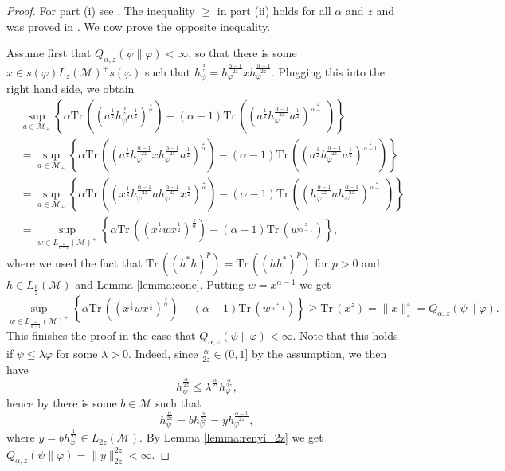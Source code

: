 \documentclass[12pt]{article}
\theoremstyle{definition}
\theoremstyle{remark}
\numberwithin{equation}{section}
\def\Me{\mathcal M}
\def \Tr{\mathrm{Tr}\,}
\begin{document}
\begin{proof} For part (i) see \cite[Theorem 1 (vi)]{kato2023onrenyi}. The
inequality $\ge$ in part (ii) holds for all $\alpha$ and $z$ and was proved in
\cite[Theorem 2 (vi)]{kato2023onrenyi}. We now prove the opposite inequality. 

Assume first that $Q_{\alpha,z}(\psi\|\varphi)<\infty$, so that there is some $x\in
s(\varphi)L_z(\Me)^+s(\varphi)$ such that
$h_\psi^{\frac{\alpha}{z}}=h_\varphi^{\frac{\alpha-1}{2z}}xh_\varphi^{\frac{\alpha-1}{2z}}$. Plugging this
into the right hand side, we obtain
\begin{align*}
&\sup_{a\in \Me_+} \left\{\alpha
\Tr\left((a^{\frac12}h_\psi^{\frac{\alpha}{z}}a^{\frac12})^{\frac{z}{\alpha}}\right)-(\alpha-1)
\Tr\left((a^{\frac12}h_\varphi^{\frac{\alpha-1}{2z}}a^{\frac12})^{\frac{z}{\alpha-1}}\right) \right\}\\
&=\sup_{a\in \Me_+} \left\{\alpha
\Tr\left((a^{\frac12}h_\varphi^{\frac{\alpha-1}{2z}}xh_\varphi^{\frac{\alpha-1}{2z}}
a^{\frac12})^{\frac{z}{\alpha}}\right)-(\alpha-1)
\Tr\left((a^{\frac12}h_\varphi^{\frac{\alpha-1}{2z}}a^{\frac12})^{\frac{z}{\alpha-1}}\right) \right\}\\
&=\sup_{a\in \Me_+} \left\{\alpha
\Tr\left((x^{\frac12}h_\varphi^{\frac{\alpha-1}{2z}}ah_\varphi^{\frac{\alpha-1}{2z}}
x^{\frac12})^{\frac{z}{\alpha}}\right)-(\alpha-1)
\Tr\left((h_\varphi^{\frac{\alpha-1}{2z}}a h_\varphi^{\frac{\alpha-1}{2z}}
)^{\frac{z}{\alpha-1}}\right)
\right\}\\
&=\sup_{w\in L_{\frac{z}{\alpha-1}}(\Me)^+} \left\{\alpha
\Tr\left((x^{\frac12}wx^{\frac12})^{\frac{z}{\alpha}}\right)-(\alpha-1)
\Tr\left(w^{\frac{z}{\alpha-1}}\right)
\right\},
\end{align*}
where we used the fact that $\Tr \left((h^*h)^p\right)=\Tr \left((hh^*)^p\right)$ for
$p>0$ and $h\in L_{\frac{p}{2}}(\Me)$ and Lemma \ref{lemma:cone}.
 Putting $w=x^{\alpha-1}$ we
get
\[
\sup_{w\in L_{\frac{z}{\alpha-1}}(\Me)^+} \left\{\alpha
\Tr\left((x^{\frac12}wx^{\frac12})^{\frac{z}{\alpha}}\right)-(\alpha-1)
\Tr\left(w^{\frac{z}{\alpha-1}}\right)
\right\}\ge \Tr(x^z)=\|x\|_z^z= Q_{\alpha,z}(\psi\|\varphi).
\]
This finishes the proof in the case that $Q_{\alpha,z}(\psi\|\varphi)<\infty$.  Note that
this holds if $\psi\le \lambda\varphi$ for some $\lambda>0$. Indeed, since
$\frac{\alpha}{2z}\in (0,1]$ by the assumption, we then have 
\[
h_\psi^{\frac{\alpha}{2z}}\le \lambda^{\frac{\alpha}{2z}}h_\varphi^{\frac{\alpha}{2z}},
\]
hence by \cite[Lemma A.58]{hiai2021quantum} there is some $b\in \Me$ such that 
\[
h_\psi^{\frac{\alpha}{2z}}=bh_\varphi^{\frac{\alpha}{2z}}=yh_\varphi^{\frac{\alpha-1}{2z}},
\]
where $y=bh_\varphi^{\frac{1}{2z}}\in L_{2z}(\Me)$. By Lemma \ref{lemma:renyi_2z} we get 
$Q_{\alpha,z}(\psi\|\varphi)=\|y\|_{2z}^{2z}<\infty$. 


\end{proof}
\end{document}
